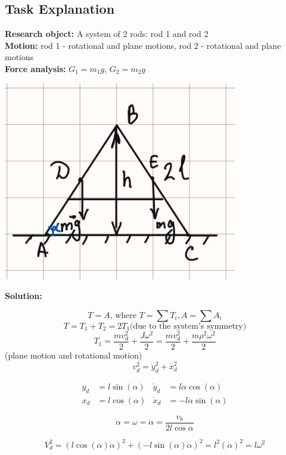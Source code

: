 \documentclass{article}
\begin{document}
\subsection{Task Explanation}

\textbf{Research object:} A system of 2 rods: rod 1 and rod 2\\
\textbf{Motion:} rod 1 - rotational and plane motions, rod 2 - rotational and plane motions\\
\textbf{Force analysis:} $G_1 = m_1 g$, $G_2 = m_2 g$\\

\begin{center}
  \includegraphics[scale=0.35]{task_scheme/task1_forces.png}
\end{center}


\textbf{Solution:}

\[T = A \text{, where } T = \sum T_i, A = \sum A_i\]
\[T = T_1 + T_2 = 2T_1 \text{(due to the system's symmetry)}\] 
\[T_1 = \dfrac{m v_d^2}{2} + \dfrac{J \omega^2}{2} = \dfrac{m v_d^2}{2} + \dfrac{m \rho^2 \omega^2}{2}\] (plane motion  and rotational motion)
\[v_d^2 = \dot y_d^2 + \dot x_d^2\]



\begin{align*}
    y_d &= l \sin(\alpha) & \dot{y}_d &= l \dot{\alpha} \cos(\alpha) \\
    x_d &= l \cos(\alpha) & \dot{x}_d &= -l \dot{\alpha} \sin(\alpha)
\end{align*}


\[ \dot \alpha = \omega = \dot \alpha = \dfrac{v_b}{2l \cos \alpha}\]

\[V_d^2 = (l \cos(\alpha) \dot{\alpha})^2 + (-l \sin(\alpha) \dot{\alpha})^2 = l^2 (\dot{\alpha})^2 = l \omega^2\]
\end{document}
